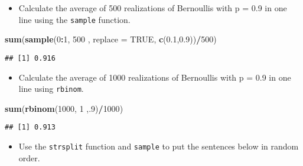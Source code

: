 \documentclass[]{article}
\newenvironment{Shaded}{\begin{snugshade}}{\end{snugshade}}
\newcommand{\KeywordTok}[1]{\textcolor[rgb]{0.13,0.29,0.53}{\textbf{#1}}}
\newcommand{\DataTypeTok}[1]{\textcolor[rgb]{0.13,0.29,0.53}{#1}}
\newcommand{\DecValTok}[1]{\textcolor[rgb]{0.00,0.00,0.81}{#1}}
\newcommand{\FloatTok}[1]{\textcolor[rgb]{0.00,0.00,0.81}{#1}}
\newcommand{\OtherTok}[1]{\textcolor[rgb]{0.56,0.35,0.01}{#1}}
\newcommand{\OperatorTok}[1]{\textcolor[rgb]{0.81,0.36,0.00}{\textbf{#1}}}
\newcommand{\NormalTok}[1]{#1}
\providecommand{\tightlist}{%
  \setlength{\itemsep}{0pt}\setlength{\parskip}{0pt}}
\begin{document}
\begin{itemize}
\tightlist
\item
  Calculate the average of 500 realizations of Bernoullis with p = 0.9
  in one line using the \texttt{sample} function.
\end{itemize}

\begin{Shaded}
\begin{Highlighting}[]
\KeywordTok{sum}\NormalTok{(}\KeywordTok{sample}\NormalTok{(}\DecValTok{0}\OperatorTok{:}\DecValTok{1}\NormalTok{, }\DecValTok{500}\NormalTok{ , }\DataTypeTok{replace =} \OtherTok{TRUE}\NormalTok{, }\KeywordTok{c}\NormalTok{(}\FloatTok{0.1}\NormalTok{,}\FloatTok{0.9}\NormalTok{))}\OperatorTok{/}\DecValTok{500}\NormalTok{)}
\end{Highlighting}
\end{Shaded}

\begin{verbatim}
## [1] 0.916
\end{verbatim}

\begin{itemize}
\tightlist
\item
  Calculate the average of 1000 realizations of Bernoullis with p = 0.9
  in one line using \texttt{rbinom}.
\end{itemize}

\begin{Shaded}
\begin{Highlighting}[]
\KeywordTok{sum}\NormalTok{(}\KeywordTok{rbinom}\NormalTok{(}\DecValTok{1000}\NormalTok{, }\DecValTok{1}\NormalTok{ ,.}\DecValTok{9}\NormalTok{)}\OperatorTok{/}\DecValTok{1000}\NormalTok{)}
\end{Highlighting}
\end{Shaded}

\begin{verbatim}
## [1] 0.913
\end{verbatim}

\begin{itemize}
\tightlist
\item
  Use the \texttt{strsplit} function and \texttt{sample} to put the
  sentences below in random order.
\end{itemize}
\end{document}
